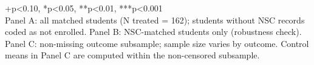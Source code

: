 \begin{table}[t]
\begin{minipage}{\linewidth}
+p\textless{}0.10, *p\textless{}0.05, **p\textless{}0.01, ***p\textless{}0.001\\
Panel A: all matched students (N treated = 162); students without NSC records coded as not enrolled. Panel B: NSC-matched students only (robustness check). Panel C: non-missing outcome subsample; sample size varies by outcome. Control means in Panel C are computed within the non-censored subsample.\\
\end{minipage}
\end{table}

